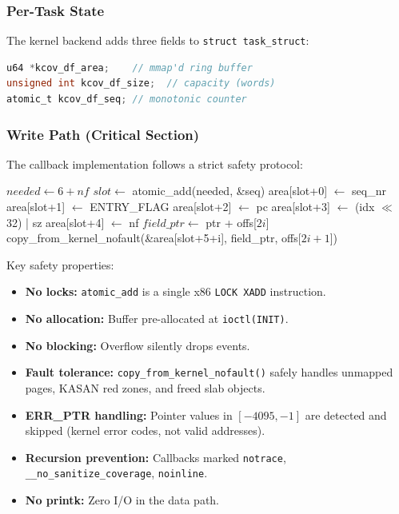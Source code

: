 \documentclass{ndss}
\begin{document}
\subsubsection{Per-Task State}

The kernel backend adds three fields to \texttt{struct task\_struct}:
\begin{lstlisting}[language=C,numbers=none]
u64 *kcov_df_area;    // mmap'd ring buffer
unsigned int kcov_df_size;  // capacity (words)
atomic_t kcov_df_seq; // monotonic counter
\end{lstlisting}

\subsubsection{Write Path (Critical Section)}

The callback implementation follows a strict safety protocol:

\begin{algorithmic}[1]
   \Return \EndIf
  \State $\mathit{needed} \gets 6 + \mathit{nf}$ 
  \State $\mathit{slot} \gets$ atomic\_add(needed, \&seq) 
   \Return \EndIf {}
  \State area[slot+0] $\gets$ seq\_nr
  \State area[slot+1] $\gets$ ENTRY\_FLAG
  \State area[slot+2] $\gets$ pc
  \State area[slot+3] $\gets$ (idx $\ll$ 32) | sz
  \State area[slot+4] $\gets$ nf
    \State $\mathit{field\_ptr} \gets$ ptr + offs[$2i$] 
    \State copy\_from\_kernel\_nofault(\&area[slot+5+i], field\_ptr, offs[$2i+1$])
  \EndFor
\EndFunction
\end{algorithmic}

Key safety properties:
\begin{itemize}[nosep]
  \item \textbf{No locks:} \texttt{atomic\_add} is a single x86
        \texttt{LOCK XADD} instruction.
  \item \textbf{No allocation:} Buffer pre-allocated at \texttt{ioctl(INIT)}.
  \item \textbf{No blocking:} Overflow silently drops events.
  \item \textbf{Fault tolerance:} \texttt{copy\_from\_kernel\_nofault()} safely
        handles unmapped pages, KASAN red zones, and freed slab objects.
  \item \textbf{ERR\_PTR handling:} Pointer values in $[-4095, -1]$ are
        detected and skipped (kernel error codes, not valid addresses).
  \item \textbf{Recursion prevention:} Callbacks marked \texttt{notrace},
        \texttt{\_\_no\_sanitize\_coverage}, \texttt{noinline}.
  \item \textbf{No printk:} Zero I/O in the data path.
\end{itemize}
\end{document}
